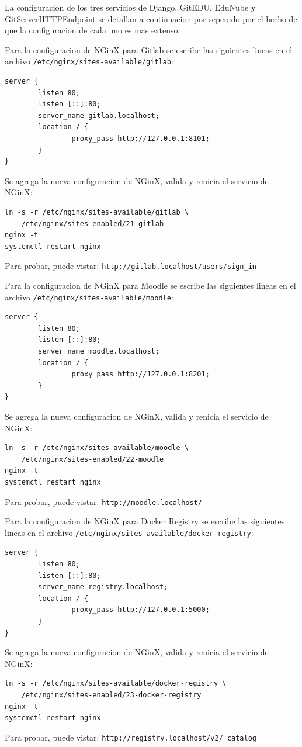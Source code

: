 La configuracion de los tres servicios de Django, GitEDU, EduNube y GitServerHTTPEndpoint se detallan a continuacion por seperado por el hecho de que la configuracion de cada uno es mas extenso.

Para la configuracion de NGinX para Gitlab se escribe las siguientes lineas en el archivo \texttt{/etc/nginx/sites-available/gitlab}:
\begin{lstlisting}
server {
        listen 80;
        listen [::]:80;
        server_name gitlab.localhost;
        location / {
                proxy_pass http://127.0.0.1:8101;
        }
}
\end{lstlisting}
Se agrega la nueva configuracion de NGinX, valida y renicia el servicio de NGinX:
\begin{lstlisting}
ln -s -r /etc/nginx/sites-available/gitlab \ 
    /etc/nginx/sites-enabled/21-gitlab
nginx -t
systemctl restart nginx
\end{lstlisting}
Para probar, puede vistar: \texttt{http://gitlab.localhost/users/sign\_in}

Para la configuracion de NGinX para Moodle se escribe las siguientes lineas en el archivo \texttt{/etc/nginx/sites-available/moodle}:
\begin{lstlisting}
server {
        listen 80;
        listen [::]:80;
        server_name moodle.localhost;
        location / {
                proxy_pass http://127.0.0.1:8201;
        }
}
\end{lstlisting}
Se agrega la nueva configuracion de NGinX, valida y renicia el servicio de NGinX:
\begin{lstlisting}
ln -s -r /etc/nginx/sites-available/moodle \ 
    /etc/nginx/sites-enabled/22-moodle
nginx -t
systemctl restart nginx
\end{lstlisting}
Para probar, puede vistar: \texttt{http://moodle.localhost/}

Para la configuracion de NGinX para Docker Registry se escribe las siguientes lineas en el archivo \texttt{/etc/nginx/sites-available/docker-registry}:
\begin{lstlisting}
server {
        listen 80;
        listen [::]:80;
        server_name registry.localhost;
        location / {
                proxy_pass http://127.0.0.1:5000;
        }
}
\end{lstlisting}
Se agrega la nueva configuracion de NGinX, valida y renicia el servicio de NGinX:
\begin{lstlisting}
ln -s -r /etc/nginx/sites-available/docker-registry \ 
    /etc/nginx/sites-enabled/23-docker-registry
nginx -t
systemctl restart nginx
\end{lstlisting}
Para probar, puede vistar: \texttt{http://registry.localhost/v2/\_catalog}


